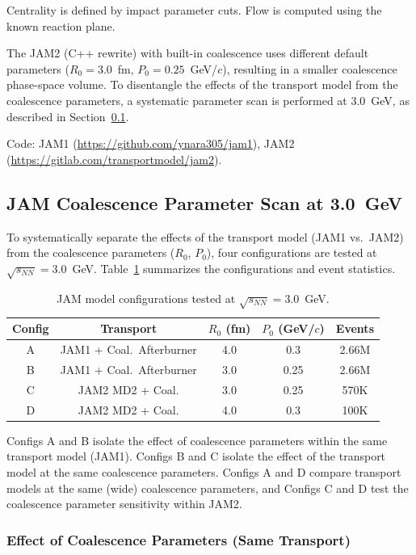 \documentclass[aps,prc,preprint,superscriptaddress,nofootinbib]{revtex4-2}
\begin{document}
Centrality is defined by impact parameter cuts. Flow is computed using the known reaction plane.

The JAM2 (C++ rewrite) with built-in coalescence uses different default parameters ($R_0 = 3.0$~fm, $P_0 = 0.25$~GeV/$c$), resulting in a smaller coalescence phase-space volume. To disentangle the effects of the transport model from the coalescence parameters, a systematic parameter scan is performed at 3.0~GeV, as described in Section~\ref{subsec:jam_param_scan}.

Code: JAM1 (\url{https://github.com/ynara305/jam1}), JAM2 (\url{https://gitlab.com/transportmodel/jam2}).

\subsection{JAM Coalescence Parameter Scan at 3.0~GeV}
\label{subsec:jam_param_scan}

To systematically separate the effects of the transport model (JAM1 vs.\ JAM2) from the coalescence parameters ($R_0$, $P_0$), four configurations are tested at $\sqrt{s_{NN}} = 3.0$~GeV. Table~\ref{tab:jam_configs} summarizes the configurations and event statistics.

\begin{table}[h]
\centering
\caption{JAM model configurations tested at $\sqrt{s_{NN}} = 3.0$~GeV.}
\label{tab:jam_configs}
\begin{tabular}{ccccc}
\toprule
Config & Transport & $R_0$ (fm) & $P_0$ (GeV/$c$) & Events \\
\midrule
A & JAM1 + Coal.\ Afterburner & 4.0 & 0.3  & 2.66M \\
B & JAM1 + Coal.\ Afterburner & 3.0 & 0.25 & 2.66M \\
C & JAM2 MD2 + Coal.          & 3.0 & 0.25 & 570K  \\
D & JAM2 MD2 + Coal.          & 4.0 & 0.3  & 100K  \\
\bottomrule
\end{tabular}
\end{table}

Configs A and B isolate the effect of coalescence parameters within the same transport model (JAM1). Configs B and C isolate the effect of the transport model at the same coalescence parameters. Configs A and D compare transport models at the same (wide) coalescence parameters, and Configs C and D test the coalescence parameter sensitivity within JAM2.

\subsubsection{Effect of Coalescence Parameters (Same Transport)}
\end{document}
